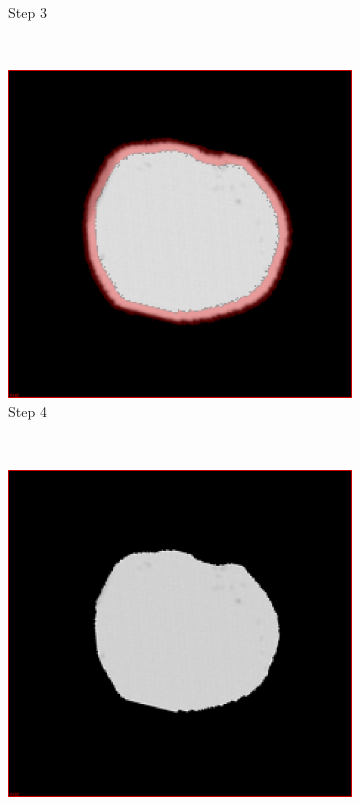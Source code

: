 \begin{figure}[h]
\begin{subfigure}[b]{0.3\textwidth}
    \caption{Step 3}
    \label{fig:erosion3}
  \end{subfigure}%
  ~ %
  \begin{subfigure}[b]{0.3\textwidth}
    \includegraphics[width=\textwidth]{images/erosion/erosion_4.png}
    \caption{Step 4}
    \label{fig:erosion4}
  \end{subfigure}  
  ~ %
  \begin{subfigure}[b]{0.3\textwidth}
    \includegraphics[width=\textwidth]{images/erosion/erosion_5.png}

\end{subfigure}
\end{figure}
